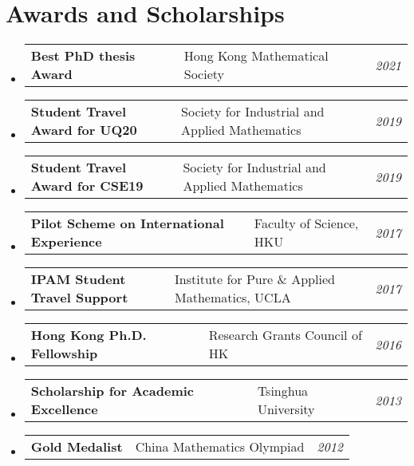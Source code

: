 \documentclass[a4paper,20pt]{article}
\makeatletter
\newcommand{\resumeSubItem}[3]{	\item{
		\begin{tabular*}{0.99\linewidth}{ll@{\extracolsep{\fill}}r}
			\textbf{#1} & #2 &  \textit{#3}
			\end{tabular*}\vspace{-5pt}
		}}
\newcommand{\resumeSubHeadingListStart}{\begin{itemize}[leftmargin=*]}
\newcommand{\resumeSubHeadingListEnd}{\end{itemize}}
\makeatother
\begin{document}
	\section{Awards and Scholarships}
	\resumeSubHeadingListStart
	\resumeSubItem{Best PhD thesis Award }{ Hong Kong Mathematical Society}{2021}
	\resumeSubItem{Student Travel Award for UQ20 }{Society for Industrial and Applied Mathematics}{2019}
	\resumeSubItem{Student Travel Award for CSE19 }{Society for Industrial and Applied Mathematics}{2019}
	\resumeSubItem{Pilot Scheme on International Experience }{ Faculty of Science, HKU}{2017}
\resumeSubItem{IPAM Student Travel Support }{ Institute for Pure \& Applied Mathematics, UCLA}{2017}
	\resumeSubItem{Hong Kong Ph.D. Fellowship }{ Research Grants Council of HK}{2016}
	\resumeSubItem{Scholarship for Academic Excellence }{ Tsinghua University}{2013}
	\resumeSubItem{Gold Medalist }{ China Mathematics Olympiad}{2012}
	\resumeSubHeadingListEnd
\end{document}
